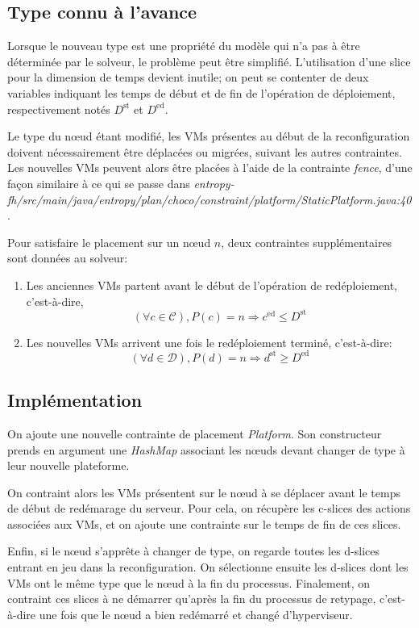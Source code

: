 \documentclass[a4paper]{article}
\begin{document}
\subsection{Type connu à l'avance}
Lorsque le nouveau type est une propriété du modèle qui n'a pas à être
déterminée par le solveur, le problème peut être simplifié. L'utilisation
d'une slice pour la dimension de temps devient inutile; on peut se contenter
de deux variables indiquant les temps de début et de fin de l'opération de
déploiement, respectivement notés $D^\mathrm{st}$ et $D^\mathrm{ed}$.

Le type du nœud étant modifié, les VMs présentes au début de la reconfiguration
doivent nécessairement être déplacées ou migrées, suivant les autres
contraintes. Les nouvelles VMs peuvent alors être placées à l'aide de
la contrainte \textit{fence}, d'une façon similaire à ce qui se passe dans
\textit{entropy-fh/src/main/java/entropy/plan/choco/constraint/platform/StaticPlatform.java:40}.

Pour satisfaire le placement sur un nœud $n$, deux contraintes supplémentaires sont
données au solveur:
\begin{enumerate}
	\item Les anciennes VMs partent avant le début de l'opération de
		redéploiement, c'est-à-dire,
\[
	(\forall c \in \mathcal C), P(c) = n \Rightarrow c^\mathrm{ed} \leq D^\mathrm{st}
\]
	\item Les nouvelles VMs arrivent une fois le redéploiement terminé,
		c'est-à-dire:
\[
	(\forall d \in \mathcal D), P(d) = n \Rightarrow d^\mathrm{st} \geq D^\mathrm{ed}
\]
\end{enumerate}

\subsection{Implémentation}


On ajoute une nouvelle contrainte de placement \textit{Platform}. Son
constructeur prends en argument une \textit{HashMap} associant les
nœuds devant changer de type à leur nouvelle plateforme.

On contraint alors les VMs présentent sur le nœud à se déplacer
avant le temps de début de redémarage du serveur. Pour cela, on
récupère les c-slices des actions associées aux VMs, et on ajoute
une contrainte sur le temps de fin de ces slices.

Enfin, si le nœud s'apprête à changer de type, on regarde toutes
les d-slices entrant en jeu dans la reconfiguration. On sélectionne
ensuite les d-slices dont les VMs ont le même type que le nœud à la fin
du processus. Finalement, on contraint ces slices à ne démarrer
qu'après la fin du processus de retypage, c'est-à-dire une fois que
le nœud a bien redémarré et changé d'hyperviseur.
\end{document}
